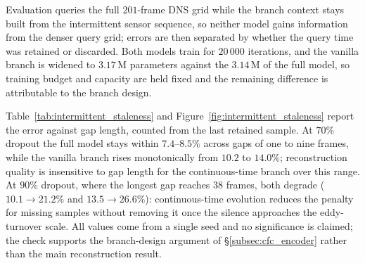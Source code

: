 Evaluation queries the full $201$-frame DNS grid while the branch context stays built from the intermittent sensor sequence, so neither model gains information from the denser query grid; errors are then separated by whether the query time was retained or discarded. Both models train for $20\,000$ iterations, and the vanilla branch is widened to $3.17$\,M parameters against the $3.14$\,M of the full model, so training budget and capacity are held fixed and the remaining difference is attributable to the branch design.

Table~\ref{tab:intermittent_staleness} and Figure~\ref{fig:intermittent_staleness} report the error against gap length, counted from the last retained sample. At $70\%$ dropout the full model stays within $7.4$--$8.5\%$ across gaps of one to nine frames, while the vanilla branch rises monotonically from $10.2$ to $14.0\%$; reconstruction quality is insensitive to gap length for the continuous-time branch over this range. At $90\%$ dropout, where the longest gap reaches $38$ frames, both degrade ($10.1 \to 21.2\%$ and $13.5 \to 26.6\%$): continuous-time evolution reduces the penalty for missing samples without removing it once the silence approaches the eddy-turnover scale. All values come from a single seed and no significance is claimed; the check supports the branch-design argument of \S\ref{subsec:cfc_encoder} rather than the main reconstruction result.

